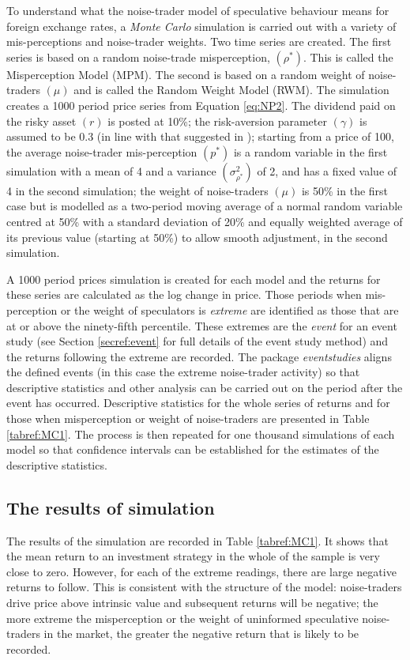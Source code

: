 \documentclass[12pt, a4paper, oneside]{article} %
\begin{document}
To understand what the noise-trader model of speculative behaviour means for foreign exchange rates, a \emph{Monte Carlo} simulation is carried out with a variety of mis-perceptions and noise-trader weights.  Two time series are created.  The first series is based on a random noise-trade misperception, $(\rho^*)$.  This is called the Misperception Model (MPM). The second is based on a random weight of noise-traders $(\mu)$ and is called the Random Weight Model (RWM).   The simulation creates a 1000 period price series from Equation \ref{eq:NP2}. The dividend paid on the risky asset $(r)$ is posted at 10\%; the risk-aversion parameter $(\gamma)$ is assumed to be 0.3 (in line with that suggested in \citep[p. 127]{FrobesBehaviour}); starting from a price of 100, the average noise-trader mis-perception $(p^*)$ is a random variable in the first simulation with a mean of 4 and a variance $(\sigma_{\rho^*}^2)$ of 2, and has a fixed value of 4 in the second simulation; the weight of noise-traders $(\mu)$ is 50\% in the first case but is modelled as a two-period moving average of a normal random variable centred at 50\% with a standard deviation of 20\% and equally weighted average of its previous value (starting at 50\%) to allow smooth adjustment, in the second simulation.   

A 1000 period prices simulation is created for each model and the returns for these series are calculated as the log change in price.  Those periods when mis-perception or the weight of speculators is \emph{extreme} are identified as those that are at or above the ninety-fifth percentile.  These extremes are the \emph{event} for an event study (see Section \ref{secref:event} for full details of the event study method) and the returns following the extreme are recorded.    The package \emph{eventstudies} \citep{eventstudies} aligns the defined events (in this case the extreme noise-trader activity) so that descriptive statistics and other analysis can be carried out on the period after the event has occurred.  
Descriptive statistics for the whole series of returns and for those when misperception or weight of noise-traders are presented in Table \ref{tabref:MC1}.  The process is then repeated for one thousand simulations of each model so that confidence intervals can be established for the estimates of the descriptive statistics.        

\subsection{The results of simulation}
The results of the simulation are recorded in Table \ref{tabref:MC1}.  It shows that the mean return to an investment strategy in the whole of the sample is very close to zero.  However, for each of the extreme readings, there are large negative returns to follow. This is consistent with the structure of the model: noise-traders drive price above intrinsic value and subsequent returns will be negative; the more extreme the misperception or the weight of uninformed speculative noise-traders in the market, the greater the negative return that is likely to be recorded.  
\end{document}
